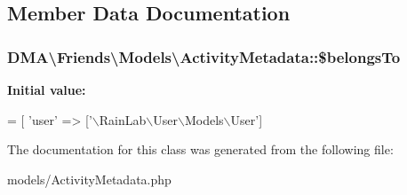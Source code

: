 \subsection{Member Data Documentation}
\hypertarget{classDMA_1_1Friends_1_1Models_1_1ActivityMetadata_a41b080a3ea1f2019d7695e7825b449fe}{
\subsubsection[{\$belongs\+To}]{\setlength{\rightskip}{0pt plus 5cm}D\+M\+A\textbackslash{}\+Friends\textbackslash{}\+Models\textbackslash{}\+Activity\+Metadata\+::\$belongs\+To}}\label{classDMA_1_1Friends_1_1Models_1_1ActivityMetadata_a41b080a3ea1f2019d7695e7825b449fe}
{\bfseries Initial value\+:}
\begin{DoxyCode}
= [
        \textcolor{stringliteral}{'user'}      => [\textcolor{stringliteral}{'\(\backslash\)RainLab\(\backslash\)User\(\backslash\)Models\(\backslash\)User'}]
\end{DoxyCode}


The documentation for this class was generated from the following file\+:\begin{DoxyCompactItemize}
\item 
models/Activity\+Metadata.\+php\end{DoxyCompactItemize}
